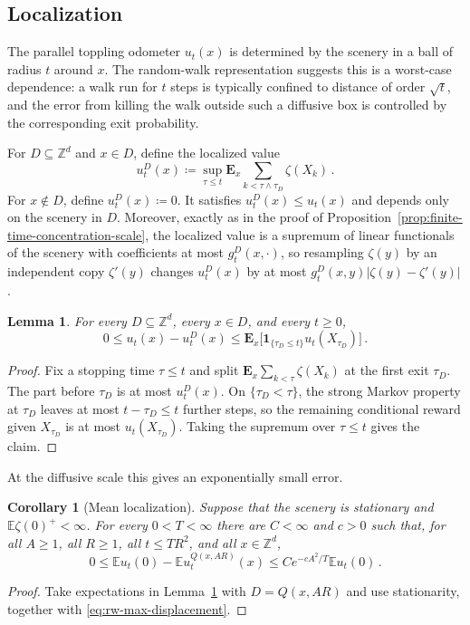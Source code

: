 \documentclass[11pt]{amsart}
\theoremstyle{plain}
\newtheorem{corollary}[theorem]{Corollary}
\newtheorem{lemma}[theorem]{Lemma}
\theoremstyle{definition}
\newcommand{\Z}{\mathbb{Z}}
\newcommand{\E}{\mathbb{E}}
\begin{document}
	\subsection{Localization}\label{ssec:localization}
	The parallel toppling odometer $u_t(x)$ is determined
	by the scenery in a ball of radius $t$ around $x$. The random-walk
	representation suggests this is a worst-case dependence: a walk run
	for $t$ steps is typically confined to distance of order $\sqrt t$, and the
	error from killing the walk outside such a diffusive box is controlled by the
	corresponding exit probability.

	For $D\subseteq\Z^d$ and $x\in D$, define the localized value
	\begin{equation}\label{eq:localized-odometer}
		u_t^D(x)\coloneqq \sup_{\tau\leq t}\mathbf E_x\sum_{k<\tau\wedge\tau_D}\zeta(X_k)\, .
	\end{equation}
	For $x\notin D$, define $u_t^D(x)\coloneqq0$.
	It satisfies $u_t^D(x)\leq u_t(x)$ and depends only on the scenery in $D$. Moreover, exactly as in the proof of Proposition~\ref{prop:finite-time-concentration-scale}, the localized value is a supremum of linear functionals of the scenery with coefficients at most $g_t^D(x,\cdot)$, so resampling $\zeta(y)$ by an independent copy $\zeta'(y)$ changes $u_t^D(x)$ by at most $g_t^D(x,y)|\zeta(y)-\zeta'(y)|$.

	\begin{lemma}\label{lem:localization-killing}
		For every $D\subseteq\Z^d$, every $x\in D$, and every $t\geq0$,
		\[
			0\leq u_t(x)-u_t^D(x)\leq\mathbf E_x\bigl[\mathbf 1_{\{\tau_D\leq t\}} u_t(X_{\tau_D})\bigr]\, .
		\]
	\end{lemma}
	\begin{proof}
		Fix a stopping time $\tau\leq t$ and split $\mathbf E_x\sum_{k<\tau}\zeta(X_k)$ at the first exit $\tau_D$. The part before $\tau_D$ is at most $u_t^D(x)$. On $\{\tau_D<\tau\}$, the strong Markov property at $\tau_D$ leaves at most $t-\tau_D\leq t$ further steps, so the remaining conditional reward given $X_{\tau_D}$ is at most $u_t(X_{\tau_D})$. Taking the supremum over $\tau\leq t$ gives the claim.
	\end{proof}

	At the diffusive scale this gives an exponentially small error.

	\begin{corollary}[Mean localization]\label{cor:mean-localization}
		Suppose that the scenery is stationary and $\E\zeta(0)^+<\infty$.
		For every $0<T<\infty$ there are $C<\infty$ and $c>0$ such that, for all
		$A\geq1$, all $R\geq1$, all $t\leq TR^2$, and all $x\in\Z^d$,
		\[
			0\leq
			\E u_t(0)-\E u_t^{Q(x,AR)}(x)
			\leq
			Ce^{-cA^2/T}\E u_t(0)\, .
		\]
	\end{corollary}
	\begin{proof}
		Take expectations in Lemma~\ref{lem:localization-killing} with
		$D=Q(x,AR)$ and use stationarity, together with
		\eqref{eq:rw-max-displacement}.
	\end{proof}
\end{document}
